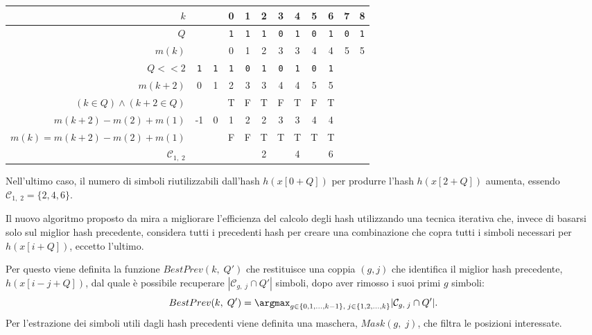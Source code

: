 \begin{example}
	\begin{center}
		\begin{tabular}{r || cc|ccccccc|cc}
			$k$ & & & 0 & 1 & 2 & 3 & 4 & 5 & 6 & 7 & 8 \\
			\midrule
			$Q$ & & & \texttt{1} & \texttt{1} & \texttt{1} & \texttt{0} & \texttt{1} & \texttt{0} & \texttt{1} & \texttt{0} & \texttt{1} \\
			$m(k)$ & & & 0 & 1 & 2 & 3 & 3 & 4 & 4 & 5 & 5 \\
			\midrule
			$Q <\!< 2$ & \texttt{1} & \texttt{1} & \texttt{1} & \texttt{0} & \texttt{1} & \texttt{0} & \texttt{1} & \texttt{0} & \texttt{1} & & \\
			$m(k + 2)$ & 0 & 1 & 2 & 3 & 3 & 4 & 4 & 5 & 5 & & \\
			\midrule
			$(k \in Q) \wedge (k + 2 \in Q)$ & & & T & F & T & F & T & F & T & & \\
			\midrule
			$m(k + 2) - m(2) + m(1)$ & -1 & 0 & 1 & 2 & 2 & 3 & 3 & 4 & 4 & & \\
			$m(k) = m(k + 2) - m(2) + m(1)$ & & & F & F & T & T & T & T & T & & \\
			\midrule
			$\mathcal{C}_{1,\; 2}$ & & & & & 2 & & 4 & & 6 & & \\
		\end{tabular}
	\end{center}
	
	Nell'ultimo caso, il numero di simboli riutilizzabili dall'hash $h(x[0 + Q])$ per produrre l'hash $h(x[2 + Q])$ aumenta, essendo $\mathcal{C}_{1,\; 2} = \{ 2, 4, 6 \}$.
\end{example}

Il nuovo algoritmo proposto da \citeauthor*{petrucci2020issh} mira a migliorare l'efficienza del calcolo degli hash utilizzando una tecnica iterativa che, invece di basarsi solo sul miglior hash precedente, considera tutti i precedenti hash per creare una combinazione che copra tutti i simboli necessari per $h(x[i + Q])$, eccetto l'ultimo.

Per questo viene definita la funzione $BestPrev(k,\; Q')$ che restituisce una coppia $(g, j)$ che identifica il miglior hash precedente, $h(x[i - j + Q])$, dal quale è possibile recuperare $|\mathcal{C}_{g,\; j} \cap Q'|$ simboli, dopo aver rimosso i suoi primi $g$ simboli: \[ BestPrev(k,\; Q') = \argmax_{g \in \{ 0, 1, \dots, k - 1 \},\; j \in \{ 1, 2, \dots, k \}} |\mathcal{C}_{g,\; j} \cap Q'|. \] Per l'estrazione dei simboli utili dagli hash precedenti viene definita una maschera, $Mask(g,\; j)$, che filtra le posizioni interessate.

